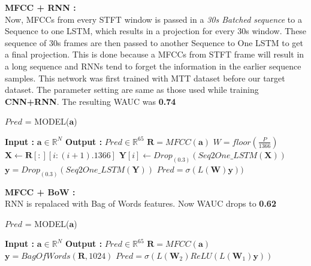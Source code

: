 \noindent \textbf{MFCC + RNN :}\\
Now, MFCCs from every STFT window is passed in a \textit{30s  Batched sequence} to a Sequence to one LSTM, which results in a projection for every 30s window. These sequence of 30s frames are then passed to another Sequence to One LSTM to get a final projection. This is done because a MFCCs from STFT frame will result in a long sequence and RNNs tend to forget the information in the earlier sequence samples. This network was first trained with MTT dataset before our target dataset. The parameter setting are same as those used while training \textbf{CNN+RNN}. The resulting WAUC was \textbf{0.74}   
\begin{algorithm}
  \caption{$Pred$ = MODEL($\textbf{a}$) }\label{alg:mfccrnn}
  \begin{algorithmic}[1]
    \Statex \textbf{Input :} $\textbf{a} \in \mathbb{R}^{N}$
    \Statex \textbf{Output :} $Pred \in \mathbb{R}^{65}$ 
    \State $\textbf{R} = MFCC(\textbf{a})$ 
        \State $W = floor(\frac{P}{1366})$
      \State $\textbf{X} \leftarrow \textbf{R}[:][i:(i+1).1366]$ 
    \State $\textbf{Y}[i] \leftarrow Drop_{(0.3)}(Seq2One\_LSTM(\textbf{X}))$ 
    \EndFor
    \State $\textbf{y} = Drop_{(0.3)}(Seq2One\_LSTM(\textbf{Y}))$ 
    \State $Pred = \sigma(L(\textbf{W})\textbf{y}))$ 
  \end{algorithmic}
\end{algorithm}

\noindent \textbf{MFCC + BoW :}\\
RNN is repalaced with Bag of Words features. Now WAUC drops to \textbf{0.62}
\begin{algorithm}
  \caption{$Pred$ = MODEL($\textbf{a}$) }\label{alg:mfccbow}
  \begin{algorithmic}[1]
    \Statex \textbf{Input :} $\textbf{a} \in \mathbb{R}^{N}$
    \Statex \textbf{Output :} $Pred \in \mathbb{R}^{65}$ 
    \State $\textbf{R} = MFCC(\textbf{a})$ 
   \State $\textbf{y} = BagOfWords(\textbf{R},1024)$ 
     \State $Pred = \sigma(L(\textbf{W}_{2})ReLU(L(\textbf{W}_{1})\textbf{y}))$ 
  \end{algorithmic}
\end{algorithm}
    

